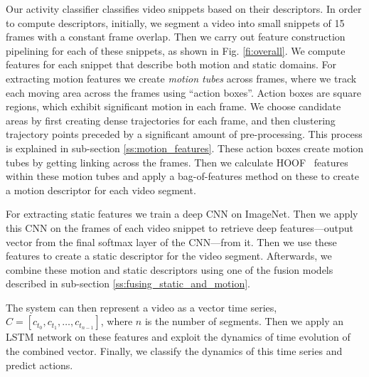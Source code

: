 Our activity classifier classifies video snippets based on their descriptors. In order to compute descriptors, initially, we segment a video into small snippets of 15 frames with a constant frame overlap.
Then we carry out feature construction pipelining for each of these snippets, as shown in Fig. \ref{fi:overall}.
We compute features for each snippet that describe both motion and static domains. 
For extracting motion features we create \textit{motion tubes} across frames, where we track each moving area across the frames using ``action boxes''.
Action boxes are square regions, which exhibit significant motion in each frame. We choose candidate areas by first creating dense trajectories for each frame,
and then clustering trajectory points preceded by a significant amount of pre-processing. This process is explained in sub-section \ref{ss:motion_features}.
These action boxes create motion tubes by getting linking across the frames. Then we calculate HOOF~\cite{chaudhry2009histograms} features within these motion tubes and apply a
bag-of-features method on these to create a motion descriptor for each video segment.

For extracting static features we train a deep CNN on ImageNet. Then we apply this CNN
on the frames of each video snippet to retrieve deep features---output vector from the final softmax layer of the CNN---from it. Then we use these features
to create a static descriptor for the video segment. Afterwards, we combine these motion and static descriptors using one of the fusion models described in sub-section \ref{ss:fusing_static_and_motion}.

The system can then represent a video as a vector time series, $C = [c_{t_0}, c_{t_1}, \dots, c_{t_{n-1}}]$,
where $n$ is the number of segments. Then we apply an LSTM network on these features and exploit the dynamics of time evolution of the combined vector.
Finally, we classify the dynamics of this time series and predict actions.



